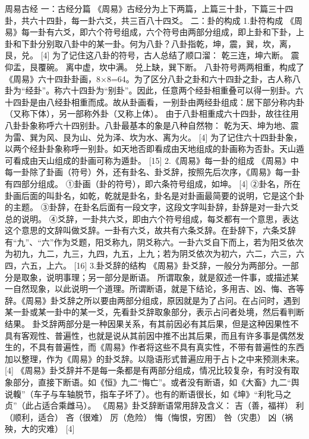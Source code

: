 \documentclass[12pt,UTF8]{ctexbook}
\begin{document}
周易古经
一：古经分篇
《周易》古经分为上下两篇，上篇三十卦，下篇三十四卦，共六十四卦，每一卦六爻，共三百八十四爻。
二：卦的构成
1.卦符构成
《周易》每一卦有六爻，即六个符号组成，六个符号由两部分组成，即上卦和下卦，上卦和下卦分别取八卦中的某一卦。何为八卦？八卦指乾，坤，震，巽，坎，离，艮，兑。 [4]
为了记住这八卦的符号，古人总结了顺口溜：
乾三连，坤六断。
震仰盂，艮覆碗。
离中虚，坎中满。
兑上缺，巽下断。
八卦符号两两相重，构成了《周易》六十四卦卦画，8×8=64。为了区分八卦之卦和六十四卦之卦，古人称八卦为“经卦”。称六十四卦为“别卦”。因此，任意两个经卦相重叠可以得一别卦。六十四卦是由八经卦相重而成。故从卦画看，一别卦由两经卦组成：居下部分称内卦（又称下体），另一部称外卦（又称上体）。
由于八卦相重成六十四卦，故往往用八卦卦象称呼六十四别卦。八卦最基本的象是八种自然物：
乾为天、坤为地、震为雷、巽为风、艮为山、兑为泽、坎为水、离为火。 [4]
为了记住六十四卦卦象，以两个经卦卦象称呼一别卦。如天地否即看成由天地组成的卦画称为否卦。天山遁可看成由天山组成的卦画可称为遁卦。 [15]
2.《周易》每一卦的组成
《周易》中每一卦除了卦画（符号）外，还有卦名、卦爻辞，按照先后次序，《周易》每一卦有四部分组成。
①卦画（卦的符号），即六条符号组成，如坤。 [4]
②卦名，所在卦画后面的叫卦名，如乾，乾就是卦名，卦名是对卦画最简要的说明，它是这个卦的主题。
③卦辞，在卦名后面有一段文字，这段文字叫卦辞，卦辞是对一卦六爻总的说明。
④爻辞，一卦共六爻，即由六个符号组成，每爻都有一个意思，表达这个意思的文辞叫做爻辞。一卦有六爻，故共有六条爻辞。在卦辞下，六条爻辞有“九”、“六”作为爻题，阳爻称九，阴爻称六。一卦六爻自下而上，若为阳爻依次为初九，九二，九三，九四，九五，上九；若为阴爻依次为初六，六二，六三，六四，六五，上六。 [16]
3.卦爻辞的结构
《周易》卦爻辞，一般分为两部分。一部分是取象，说明事理；另一部分是断语。
所谓取象，就是叙述一件事，或描述某一自然现象，以此说明一个道理。所谓断语，就是下结论，多用吉、凶、悔、吝等辞。《周易》卦爻辞之所以要由两部分组成，原因就是为了占问。在占问时，遇到某一卦或某一卦中的某一爻，先看卦爻辞取象部分，表示占问者处境，然后看判断结果。
卦爻辞两部分是一种因果关系，有其前因必有其后果，但是这种因果性不具有客观性、普遍性，也就是说从其前因中推不出其后果，而且有许多事是偶然发生的，不具有普遍性，而《周易》作者将这些不具有真实性，不带有普遍性的东西加以整理，作为《周易》的卦爻辞。以隐语形式普遍应用于占卜之中来预测未来。 [4]
《周易》卦爻辞并不是每一条都是有两部分组成，情况比较复杂，有时没有取象部分，直接下断语。如《恒》九二“悔亡”。或者没有断语，如《大畜》九二“舆说輹”（车子与车轴脱节，指车子坏了）。也有的断语很长，如《坤》“利牝马之贞”（此占适合乘雌马）。
《周易》卦爻辞断语常用辞及含义：
吉（善，福祥）
利（顺利，适合）
吝（很难）
厉（危险）
悔（悔恨，穷困）
咎（灾患）
凶（祸殃，大的灾难） [4]
\end{document}
